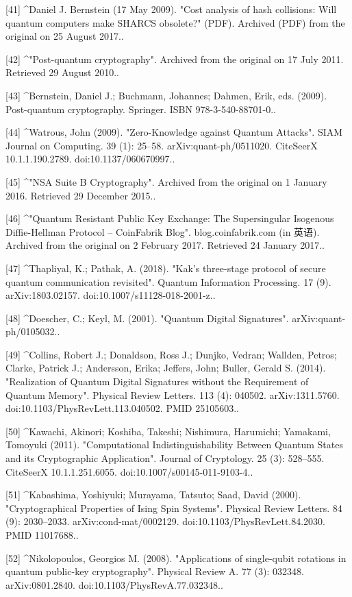 [41]
^Daniel J. Bernstein (17 May 2009). "Cost analysis of hash collisions: Will quantum computers make SHARCS obsolete?" (PDF). Archived (PDF) from the original on 25 August 2017..

[42]
^"Post-quantum cryptography". Archived from the original on 17 July 2011. Retrieved 29 August 2010..

[43]
^Bernstein, Daniel J.; Buchmann, Johannes; Dahmen, Erik, eds. (2009). Post-quantum cryptography. Springer. ISBN 978-3-540-88701-0..

[44]
^Watrous, John (2009). "Zero-Knowledge against Quantum Attacks". SIAM Journal on Computing. 39 (1): 25–58. arXiv:quant-ph/0511020. CiteSeerX 10.1.1.190.2789. doi:10.1137/060670997..

[45]
^"NSA Suite B Cryptography". Archived from the original on 1 January 2016. Retrieved 29 December 2015..

[46]
^"Quantum Resistant Public Key Exchange: The Supersingular Isogenous Diffie-Hellman Protocol – CoinFabrik Blog". blog.coinfabrik.com (in 英语). Archived from the original on 2 February 2017. Retrieved 24 January 2017..

[47]
^Thapliyal, K.; Pathak, A. (2018). "Kak's three-stage protocol of secure quantum communication revisited". Quantum Information Processing. 17 (9). arXiv:1803.02157. doi:10.1007/s11128-018-2001-z..

[48]
^Doescher, C.; Keyl, M. (2001). "Quantum Digital Signatures". arXiv:quant-ph/0105032..

[49]
^Collins, Robert J.; Donaldson, Ross J.; Dunjko, Vedran; Wallden, Petros; Clarke, Patrick J.; Andersson, Erika; Jeffers, John; Buller, Gerald S. (2014). "Realization of Quantum Digital Signatures without the Requirement of Quantum Memory". Physical Review Letters. 113 (4): 040502. arXiv:1311.5760. doi:10.1103/PhysRevLett.113.040502. PMID 25105603..

[50]
^Kawachi, Akinori; Koshiba, Takeshi; Nishimura, Harumichi; Yamakami, Tomoyuki (2011). "Computational Indistinguishability Between Quantum States and its Cryptographic Application". Journal of Cryptology. 25 (3): 528–555. CiteSeerX 10.1.1.251.6055. doi:10.1007/s00145-011-9103-4..

[51]
^Kabashima, Yoshiyuki; Murayama, Tatsuto; Saad, David (2000). "Cryptographical Properties of Ising Spin Systems". Physical Review Letters. 84 (9): 2030–2033. arXiv:cond-mat/0002129. doi:10.1103/PhysRevLett.84.2030. PMID 11017688..

[52]
^Nikolopoulos, Georgios M. (2008). "Applications of single-qubit rotations in quantum public-key cryptography". Physical Review A. 77 (3): 032348. arXiv:0801.2840. doi:10.1103/PhysRevA.77.032348..

